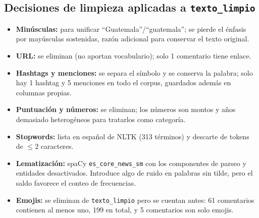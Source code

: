 \documentclass[11pt,a4paper]{article}
\begin{document}
\subsection{Decisiones de limpieza aplicadas a \texttt{texto\_limpio}}
\begin{itemize}[leftmargin=1.4em,itemsep=1pt]
  \item \textbf{Min\'usculas:} para unificar ``Guatemala''/``guatemala''; se pierde el \'enfasis por
        may\'usculas sostenidas, raz\'on adicional para conservar el texto original.
  \item \textbf{URL:} se eliminan (no aportan vocabulario); solo 1 comentario tiene enlace.
  \item \textbf{Hashtags y menciones:} se separa el s\'imbolo y se conserva la palabra; solo hay
        1 hashtag y 5 menciones en todo el corpus, guardados adem\'as en columnas propias.
  \item \textbf{Puntuaci\'on y n\'umeros:} se eliminan; los n\'umeros son montos y a\~nos demasiado
        heterog\'eneos para tratarlos como categor\'ia.
  \item \textbf{Stopwords:} lista en espa\~nol de NLTK (313 t\'erminos) y descarte de tokens de
        $\leq 2$ caracteres.
  \item \textbf{Lematizaci\'on:} spaCy \texttt{es\_core\_news\_sm} con los componentes de parseo y
        entidades desactivados. Introduce algo de ruido en palabras sin tilde, pero el saldo favorece
        el conteo de frecuencias.
  \item \textbf{Emojis:} se eliminan de \texttt{texto\_limpio} pero se cuentan antes: 61 comentarios
        contienen al menos uno, 199 en total, y 5 comentarios son solo emojis.
\end{itemize}
\end{document}
